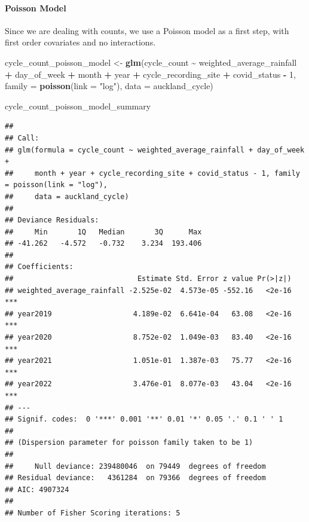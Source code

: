 \documentclass[
]{article}
\newenvironment{Shaded}{\begin{snugshade}}{\end{snugshade}}
\newcommand{\AttributeTok}[1]{\textcolor[rgb]{0.13,0.29,0.53}{#1}}
\newcommand{\DecValTok}[1]{\textcolor[rgb]{0.00,0.00,0.81}{#1}}
\newcommand{\FunctionTok}[1]{\textcolor[rgb]{0.13,0.29,0.53}{\textbf{#1}}}
\newcommand{\NormalTok}[1]{#1}
\newcommand{\OtherTok}[1]{\textcolor[rgb]{0.56,0.35,0.01}{#1}}
\newcommand{\SpecialCharTok}[1]{\textcolor[rgb]{0.81,0.36,0.00}{\textbf{#1}}}
\newcommand{\StringTok}[1]{\textcolor[rgb]{0.31,0.60,0.02}{#1}}
\begin{document}
\hypertarget{poisson-model}{%
\paragraph{Poisson Model}\label{poisson-model}}

Since we are dealing with counts, we use a Poisson model as a first
step, with first order covariates and no interactions.

\begin{Shaded}
\begin{Highlighting}[]
\NormalTok{cycle\_count\_poisson\_model }\OtherTok{\textless{}{-}} \FunctionTok{glm}\NormalTok{(cycle\_count }\SpecialCharTok{\textasciitilde{}}\NormalTok{ weighted\_average\_rainfall }\SpecialCharTok{+}\NormalTok{ day\_of\_week }\SpecialCharTok{+}\NormalTok{ month }\SpecialCharTok{+}\NormalTok{ year }\SpecialCharTok{+}\NormalTok{ cycle\_recording\_site }\SpecialCharTok{+}\NormalTok{ covid\_status }\SpecialCharTok{{-}} \DecValTok{1}\NormalTok{, }\AttributeTok{family =} \FunctionTok{poisson}\NormalTok{(}\AttributeTok{link =} \StringTok{"log"}\NormalTok{), }\AttributeTok{data =}\NormalTok{ auckland\_cycle)}
\end{Highlighting}
\end{Shaded}

\begin{Shaded}
\begin{Highlighting}[]
\NormalTok{cycle\_count\_poisson\_model\_summary}
\end{Highlighting}
\end{Shaded}

\begin{verbatim}
## 
## Call:
## glm(formula = cycle_count ~ weighted_average_rainfall + day_of_week + 
##     month + year + cycle_recording_site + covid_status - 1, family = poisson(link = "log"), 
##     data = auckland_cycle)
## 
## Deviance Residuals: 
##     Min       1Q   Median       3Q      Max  
## -41.262   -4.572   -0.732    3.234  193.406  
## 
## Coefficients:
##                             Estimate Std. Error z value Pr(>|z|)    
## weighted_average_rainfall -2.525e-02  4.573e-05 -552.16   <2e-16 ***
## year2019                   4.189e-02  6.641e-04   63.08   <2e-16 ***
## year2020                   8.752e-02  1.049e-03   83.40   <2e-16 ***
## year2021                   1.051e-01  1.387e-03   75.77   <2e-16 ***
## year2022                   3.476e-01  8.077e-03   43.04   <2e-16 ***
## ---
## Signif. codes:  0 '***' 0.001 '**' 0.01 '*' 0.05 '.' 0.1 ' ' 1
## 
## (Dispersion parameter for poisson family taken to be 1)
## 
##     Null deviance: 239480046  on 79449  degrees of freedom
## Residual deviance:   4361284  on 79366  degrees of freedom
## AIC: 4907324
## 
## Number of Fisher Scoring iterations: 5
\end{verbatim}
\end{document}
